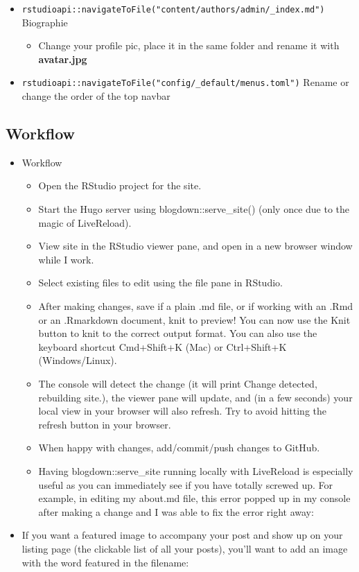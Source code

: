 \documentclass[
]{article}
\providecommand{\tightlist}{%
  \setlength{\itemsep}{0pt}\setlength{\parskip}{0pt}}
\begin{document}
\begin{itemize}
\tightlist
\item
  \texttt{rstudioapi::navigateToFile("content/authors/admin/\_index.md")}
  Biographie

  \begin{itemize}
  \tightlist
  \item
    Change your profile pic, place it in the same folder and rename
    it with \textbf{avatar.jpg}
  \end{itemize}
\item
  \texttt{rstudioapi::navigateToFile("config/\_default/menus.toml")} Rename or
  change the order of the top navbar
\end{itemize}

\hypertarget{workflow-1}{%
\subsection{Workflow}\label{workflow-1}}

\begin{itemize}
\tightlist
\item
  Workflow

  \begin{itemize}
  \tightlist
  \item
    Open the RStudio project for the site.
  \item
    Start the Hugo server using blogdown::serve\_site() (only once
    due to the magic of LiveReload).
  \item
    View site in the RStudio viewer pane, and open in a new browser
    window while I work.
  \item
    Select existing files to edit using the file pane in RStudio.
  \item
    After making changes, save if a plain .md file, or if working
    with an .Rmd or an .Rmarkdown document, knit to preview! You can
    now use the Knit button to knit to the correct output format.
    You can also use the keyboard shortcut Cmd+Shift+K (Mac) or
    Ctrl+Shift+K (Windows/Linux).
  \item
    The console will detect the change (it will print Change
    detected, rebuilding site.), the viewer pane will update, and
    (in a few seconds) your local view in your browser will also
    refresh. Try to avoid hitting the refresh button in your
    browser.
  \item
    When happy with changes, add/commit/push changes to GitHub.
  \item
    Having blogdown::serve\_site running locally with LiveReload is
    especially useful as you can immediately see if you have totally
    screwed up. For example, in editing my about.md file, this error
    popped up in my console after making a change and I was able to
    fix the error right away:
  \end{itemize}
\item
  If you want a featured image to accompany your post and show up on
  your listing page (the clickable list of all your posts), you'll
  want to add an image with the word featured in the filename:
\end{itemize}
\end{document}

